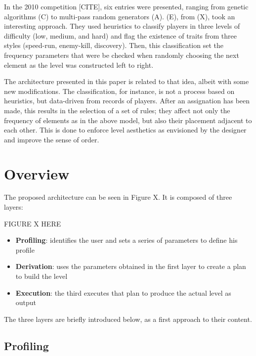 \documentclass[conference]{IEEEtran}
\begin{document}
In the 2010 competition [CITE], six entries were presented, ranging from genetic algorithms (C) to multi-pass random generators (A). (E), from (X), took an interesting approach. They used heuristics to classify players in three levels of difficulty (low, medium, and hard) and flag the existence of traits from three styles (speed-run, enemy-kill, discovery). Then, this classification set the frequency parameters that were be checked when randomly choosing the next element as the level was constructed left to right.

The architecture presented in this paper is related to that idea, albeit with some new modifications. The classification, for instance, is not a process based on heuristics, but data-driven from records of players. After an assignation has been made, this results in the selection of a set of rules; they affect not only the frequency of elements as in the above model, but also their placement adjacent to each other. This is done to enforce level aesthetics as envisioned by the designer and improve the sense of order.

\section{Overview}

The proposed architecture can be seen in Figure X. It is composed of three layers:

FIGURE X HERE

\begin{itemize}
	
\item \textbf{Profiling}: identifies the user and sets a series of parameters to define his profile

\item \textbf{Derivation}: uses the parameters obtained in the first layer to create a plan to build the level

\item \textbf{Execution}: the third executes that plan to produce the actual level as output

\end{itemize}

The three layers are briefly introduced below, as a first approach to their content.

\subsection{Profiling}
\end{document}
